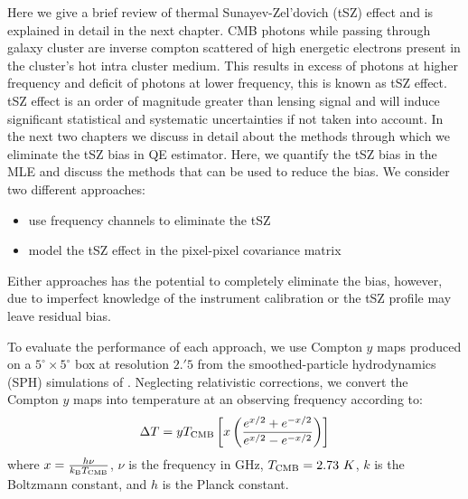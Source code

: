 Here we give a brief review of thermal Sunayev-Zel'dovich (tSZ) effect and is explained in detail in the next chapter.
CMB photons while passing through galaxy cluster are inverse compton scattered of high energetic electrons present in the cluster's hot intra cluster medium.
This results in excess of photons at higher frequency and deficit of photons at lower frequency, this is known as tSZ effect.
tSZ effect is an order of magnitude greater than lensing signal and will induce significant statistical and systematic uncertainties if not taken into account.
In the next two chapters we discuss in detail about the methods through which we eliminate the tSZ bias in QE estimator.
Here, we quantify the tSZ bias in the MLE and discuss the methods that can be used to reduce the bias.
We consider two different approaches:
\begin{itemize}
\item use frequency channels to eliminate the tSZ
\item model the tSZ effect in the pixel-pixel covariance matrix
\end{itemize}
Either approaches has the potential to completely eliminate the bias, however, due to imperfect knowledge of the instrument calibration or the tSZ profile may leave residual bias. 


To evaluate the performance of each approach,  we use Compton $y$ maps produced on a $5^{\circ} \times 5^{\circ}$ box at resolution $2.'5$ from the smoothed-particle hydrodynamics (SPH) simulations of  \citet{mccarthy13}.
Neglecting relativistic corrections, we convert the Compton $y$ maps into temperature at an observing frequency according to:
\begin{eqnarray}
\Delta T = y T_{\rm CMB} \left[x \left(\frac{e^{x/2} + e^{-x/2}}{e^{x/2} - e^{-x/2}}  \right)\right]
\end{eqnarray} where $x = \frac{h\nu}{k_{\rm B}T_{\rm CMB}}$, $\nu$ is the frequency in GHz, $T_{\rm CMB} = 2.73\ K$, $k$ is the Boltzmann constant, and $h$ is the Planck constant.

